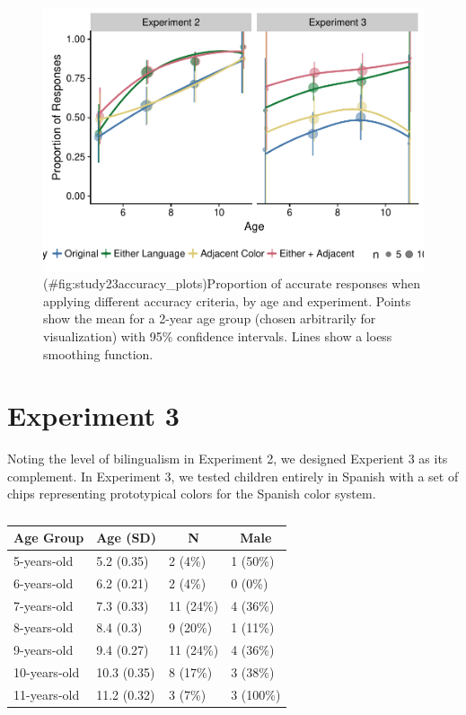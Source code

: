 \documentclass[,man,floatsintext]{apa6}
\theoremstyle{definition}
\theoremstyle{definition}
\theoremstyle{definition}
\theoremstyle{remark}
\begin{document}
\begin{figure}
\centering
\includegraphics{amazon_color_files/figure-latex/study23accuracy_plots-1.pdf}
\caption{(\#fig:study23accuracy\_plots)Proportion of accurate responses
when applying different accuracy criteria, by age and experiment. Points
show the mean for a 2-year age group (chosen arbitrarily for
visualization) with 95\% confidence intervals. Lines show a loess
smoothing function.}
\end{figure}

\section{Experiment 3}\label{experiment-3}

Noting the level of bilingualism in Experiment 2, we designed Experient
3 as its complement. In Experiment 3, we tested children entirely in
Spanish with a set of chips representing prototypical colors for the
Spanish color system.

\begin{table}[tbp]
\begin{center}
\begin{threeparttable}
\caption{\label{tab:unnamed-chunk-4}}
\begin{tabular}{llll}
\toprule
Age Group & \multicolumn{1}{c}{Age (SD)} & \multicolumn{1}{c}{N} & \multicolumn{1}{c}{Male}\\
\midrule
5-years-old & 5.2 (0.35) & 2 (4\%) & 1 (50\%)\\
6-years-old & 6.2 (0.21) & 2 (4\%) & 0 (0\%)\\
7-years-old & 7.3 (0.33) & 11 (24\%) & 4 (36\%)\\
8-years-old & 8.4 (0.3) & 9 (20\%) & 1 (11\%)\\
9-years-old & 9.4 (0.27) & 11 (24\%) & 4 (36\%)\\
10-years-old & 10.3 (0.35) & 8 (17\%) & 3 (38\%)\\
11-years-old & 11.2 (0.32) & 3 (7\%) & 3 (100\%)\\
\bottomrule
\end{tabular}
\end{threeparttable}
\end{center}
\end{table}
\end{document}
